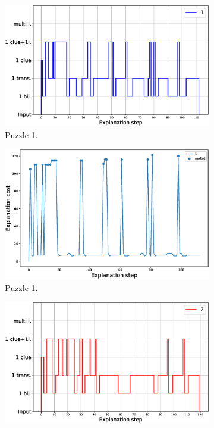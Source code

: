 \begin{figure}[t!]
		\centering
		\begin{subfigure}{.5\textwidth}
				\centering
				\includegraphics[width=0.9\linewidth]{figures/plot_cost_steps_1.eps}
				\caption{Puzzle 1.}
				\label{fig:composition_puzzle:p1}
		\end{subfigure}%
		\begin{subfigure}{.5\textwidth}
				\centering
				\includegraphics[width=0.84\linewidth]{figures/1.eps}
				\caption{Puzzle 1.}
				\label{fig:cost_puzzle:p1}
		\end{subfigure}
		\begin{subfigure}{.5\textwidth}
				\centering
				\includegraphics[width=0.9\linewidth]{figures/plot_cost_steps_2.eps}

\end{subfigure}
\end{figure}
